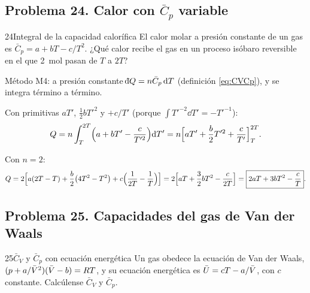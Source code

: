 \subsection{Problema 24. Calor con \texorpdfstring{$\bar C_p$}{Cp} variable}
\begin{problema}{24}{Integral de la capacidad calorífica}
El calor molar a presión constante de un gas es $\bar C_p=a+bT-c/T^2$. ¿Qué calor recibe el gas en un proceso
isóbaro reversible en el que \SI{2}{mol} pasan de $T$ a $2T$?
\end{problema}

\begin{resolucion}
\idea Método M4: a presión constante $\dbar Q=n\bar C_p\,\dd T$ (definición \eqref{eq:CVCp}), y se integra
término a término.

 Con primitivas $aT'$, $\tfrac12bT'^2$ y $+c/T'$ (porque $\int T'^{-2}\dd T'=-T'^{-1}$):
\[
  Q=n\int_{T}^{2T}\Bigl(a+bT'-\frac{c}{T'^2}\Bigr)\mathrm{d} T'
   =n\Bigl[aT'+\frac b2T'^2+\frac c{T'}\Bigr]_{T}^{2T}.
\]

 Con $n=2$:
\[
  Q=2\Bigl[a(2T-T)+\frac b2\bigl(4T^2-T^2\bigr)+c\Bigl(\frac1{2T}-\frac1T\Bigr)\Bigr]
   =2\Bigl[aT+\frac32bT^2-\frac{c}{2T}\Bigr]=\boxed{2aT+3bT^2-\frac cT}.
\]
\end{resolucion}

\subsection{Problema 25. Capacidades del gas de Van der Waals}
\begin{problema}{25}{$\bar C_V$ y $\bar C_p$ con ecuación energética}
Un gas obedece la ecuación de Van der Waals, $(p+a/\bar{V}^2)(\bar{V}-b)=RT$, y su ecuación energética es
$\bar U=cT-a/\bar{V}$, con $c$ constante. Calcúlense $\bar C_V$ y $\bar C_p$.
\end{problema}

